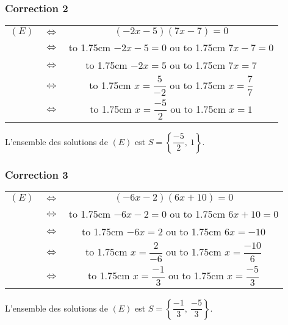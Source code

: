 \documentclass[15pt, mathserif]{beamer}
\begin{document}
\begin{frame}
\vspace{-10mm}
	\frametitle{Correction 2}
	\begin{tabular}{ccc} $(E)$ & $\Leftrightarrow$ & $(-2x-5)(7x-7)=0$  \\
		& $\Leftrightarrow$ &  \hbox to 1.75cm {\hfill $-2x-5= 0$\hfill} \quad  ou \quad  \hbox to 1.75cm {\hfill $7x-7=0$\hfill} \\
		 & $\Leftrightarrow$ & \hbox to 1.75cm {\hfill $-2x = 5$\hfill} \quad  ou \quad \hbox to 1.75cm {\hfill $7x = 7$\hfill} \\[1.5ex]
		 & $\Leftrightarrow$ & \hbox to 1.75cm {\hfill $x= \dfrac{5}{-2}$\hfill} \quad  ou \quad \hbox to 1.75cm {\hfill $x= \dfrac{7}{7}$\hfill} \\[2.5ex]
		 & $\Leftrightarrow$ & \hbox to 1.75cm {\hfill $x = \dfrac{-5}{2}$\hfill} \quad  ou \quad \hbox to 1.75cm {\hfill $x = 1$\hfill}
	\end{tabular}

\bigskip

L'ensemble des solutions de $(E)$ est $S=\left\{\dfrac{-5}{2},~1\right\}$.\end{frame}


\begin{frame}
\vspace{-10mm}
	\frametitle{Correction 3}
	\begin{tabular}{ccc} $(E)$ & $\Leftrightarrow$ & $(-6x-2)(6x+10)=0$  \\
		& $\Leftrightarrow$ &  \hbox to 1.75cm {\hfill $-6x-2= 0$\hfill} \quad  ou \quad  \hbox to 1.75cm {\hfill $6x+10=0$\hfill} \\
		 & $\Leftrightarrow$ & \hbox to 1.75cm {\hfill $-6x = 2$\hfill} \quad  ou \quad \hbox to 1.75cm {\hfill $6x = -10$\hfill} \\[1.5ex]
		 & $\Leftrightarrow$ & \hbox to 1.75cm {\hfill $x= \dfrac{2}{-6}$\hfill} \quad  ou \quad \hbox to 1.75cm {\hfill $x= \dfrac{-10}{6}$\hfill} \\[2.5ex]
		 & $\Leftrightarrow$ & \hbox to 1.75cm {\hfill $x = \dfrac{-1}{3}$\hfill} \quad  ou \quad \hbox to 1.75cm {\hfill $x = \dfrac{-5}{3}$\hfill}
	\end{tabular}

\bigskip

L'ensemble des solutions de $(E)$ est $S=\left\{\dfrac{-1}{3},~\dfrac{-5}{3}\right\}$.\end{frame}
\end{document}
